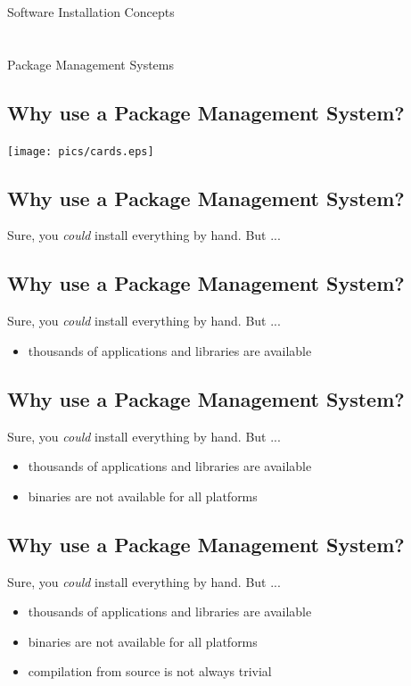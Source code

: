 \documentclass[xga]{xdvislides}
\begin{document}
\newpage
\vspace*{\fill}
\begin{center}
	\Hugesize
		Software Installation Concepts \\ [1em]
	\hspace*{5mm}
	\blueline\\
	\hspace*{5mm}\\
		Package Management Systems
\end{center}
\vspace*{\fill}

\subsection{Why use a Package Management System?}
\vspace*{\fill}
\begin{center}
	\texttt{[image: pics/cards.eps]}
\end{center}
\vspace*{\fill}

\subsection{Why use a Package Management System?}
Sure, you {\em could} install everything by hand.  But ...

\subsection{Why use a Package Management System?}
Sure, you {\em could} install everything by hand.  But ...
\begin{itemize}
	\item thousands of applications and libraries are available
\end{itemize}

\subsection{Why use a Package Management System?}
Sure, you {\em could} install everything by hand.  But ...
\begin{itemize}
	\item thousands of applications and libraries are available
	\item binaries are not available for all platforms
\end{itemize}

\subsection{Why use a Package Management System?}
Sure, you {\em could} install everything by hand.  But ...
\begin{itemize}
	\item thousands of applications and libraries are available
	\item binaries are not available for all platforms
	\item compilation from source is not always trivial
\end{itemize}
\end{document}
